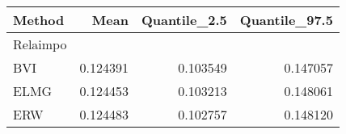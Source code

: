 \begin{table}[ht]
\centering
\begin{tabular}{lrrr}
  \hline
Method & Mean & Quantile\_2.5 & Quantile\_97.5 \\ 
  \hline
Relaimpo &  &  &  \\ 
  BVI & 0.124391 & 0.103549 & 0.147057 \\ 
  ELMG & 0.124453 & 0.103213 & 0.148061 \\ 
  ERW & 0.124483 & 0.102757 & 0.148120 \\ 
   \hline
\end{tabular}
\end{table}
